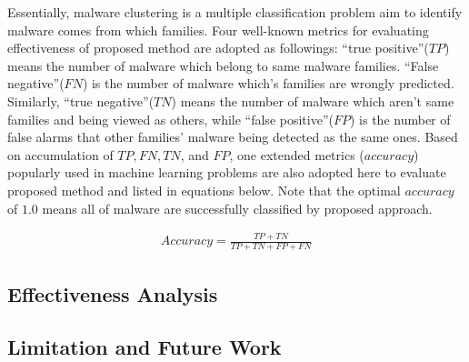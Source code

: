Essentially, malware clustering is a multiple classification problem aim to identify malware comes from which families. Four well-known metrics for evaluating effectiveness of proposed method are adopted as followings: ``true positive''($TP$) means the number of malware which belong to same malware families. ``False negative''($FN$) is the number of malware which's families are wrongly predicted. Similarly, ``true negative''($TN$) means the number of malware which aren't same families and being viewed as others, while ``false positive''($FP$) is the number of false alarms that other families' malware being detected as the same ones. Based on accumulation of $TP, FN, TN$, and $FP$, one extended metrics ($accuracy$) popularly used in machine learning problems are also adopted here to evaluate proposed method and listed in equations below. Note that the optimal $accuracy$ of $1.0$ means all of malware are successfully classified by proposed approach. 

\begin{eqnarray}
\label{eq:accuracy}
Accuracy = \frac{TP+TN}{TP+TN+FP+FN}
\end{eqnarray}

\subsection{Effectiveness Analysis}

{\color{red}{Tony, pliz show your exp graph and table here!!!}}

\subsection{Limitation and Future Work}
